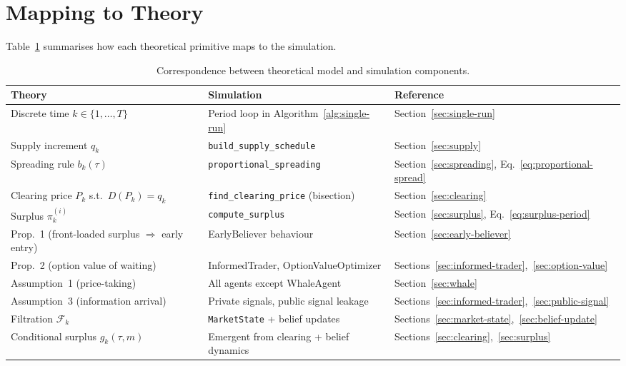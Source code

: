 \documentclass[11pt,a4paper]{article}
\newcommand{\cF}{\mathcal{F}}
\begin{document}
\section{Mapping to Theory}
\label{sec:mapping}

Table~\ref{tab:mapping} summarises how each theoretical primitive maps to the simulation.

\begin{table}[h]
\centering
\caption{Correspondence between theoretical model and simulation components.}
\label{tab:mapping}
\begin{tabular}{@{}p{4.5cm}p{4.5cm}p{5cm}@{}}
\toprule
\textbf{Theory} & \textbf{Simulation} & \textbf{Reference} \\
\midrule
Discrete time $k \in \{1,\dots,T\}$              & Period loop in Algorithm~\ref{alg:single-run}            & Section~\ref{sec:single-run} \\
Supply increment $q_k$                            & \texttt{build\_supply\_schedule}                          & Section~\ref{sec:supply} \\
Spreading rule $b_k(\tau)$                        & \texttt{proportional\_spreading}                          & Section~\ref{sec:spreading}, Eq.~\eqref{eq:proportional-spread} \\
Clearing price $P_k$ s.t.\ $D(P_k) = q_k$        & \texttt{find\_clearing\_price} (bisection)                & Section~\ref{sec:clearing} \\
Surplus $\pi_k^{(i)}$                             & \texttt{compute\_surplus}                                 & Section~\ref{sec:surplus}, Eq.~\eqref{eq:surplus-period} \\
Prop.~1 (front-loaded surplus $\Rightarrow$ early entry)  & EarlyBeliever behaviour                          & Section~\ref{sec:early-believer} \\
Prop.~2 (option value of waiting)                 & InformedTrader, OptionValueOptimizer             & Sections~\ref{sec:informed-trader},~\ref{sec:option-value} \\
Assumption~1 (price-taking)                       & All agents except WhaleAgent                              & Section~\ref{sec:whale} \\
Assumption~3 (information arrival)                & Private signals, public signal leakage                    & Sections~\ref{sec:informed-trader},~\ref{sec:public-signal} \\
Filtration $\cF_k$                                & \texttt{MarketState} + belief updates                     & Sections~\ref{sec:market-state},~\ref{sec:belief-update} \\
Conditional surplus $g_k(\tau,m)$                 & Emergent from clearing + belief dynamics                   & Sections~\ref{sec:clearing},~\ref{sec:surplus} \\
\bottomrule
\end{tabular}
\end{table}
\end{document}
